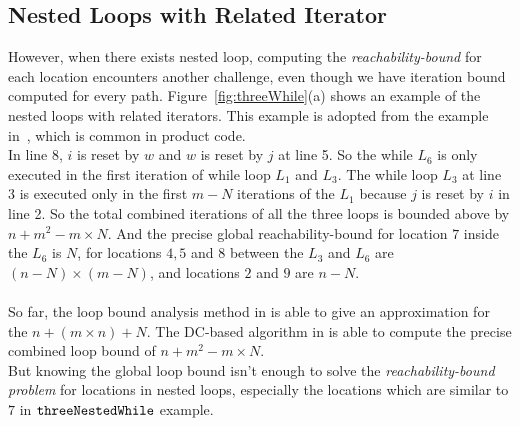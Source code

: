 \subsection{Nested Loops with Related Iterator}
\label{sec:overview-nestedwhile}
However, when there exists nested loop, computing the \emph{reachability-bound} for each location encounters another challenge, even though we have
iteration bound computed for every path.
Figure~\ref{fig:threeWhile}(a) shows an example of the nested loops with related 
iterators.
This example is adopted from the example in~\cite{GulwaniJK09}, which is common in product code.
\\
In line 8, $i$ is reset by $w$ and $w$ is reset by $j$ at line 5. So the
while $L_6$ is only executed in the first iteration of while loop $L_1$ and $L_3$.
The while loop $L_3$ at line 3 is executed only in 
the first $m - N$ iterations of the 
$L_1$ because $j$ is reset by $i$ in line 2.
So the total combined iterations of all the three loops is bounded above by 
$n + m^2 - m \times N$.
And the precise global reachability-bound for location $7$ inside the $L_6$ is $N$,
for locations $4, 5$ and $8$ between the $L_3$ and $L_6$ are $(n-N) \times (m - N)$,
and locations $2$ and $9$ are $n - N$.
\\
\\
So far, the loop bound analysis method in \cite{GulwaniJK09} is able to give
an approximation for the $n + (m \times n) + N$. 
The DC-based algorithm in \cite{sinn2017complexity} is able to
compute the precise combined loop bound of $n + m^2 - m \times N$.
\\
But knowing the global loop bound isn't enough to solve the \emph{reachability-bound problem} for locations in nested loops,
especially the locations which are similar to $7$ in ${\mathtt{threeNestedWhile}}$ example.
\\
